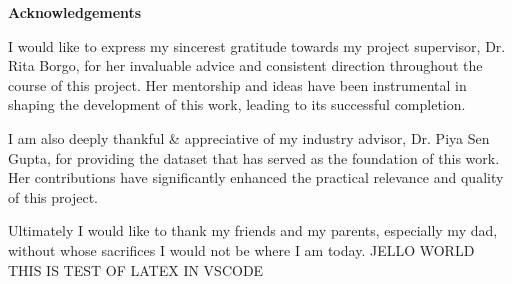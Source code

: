 
\mbox{}\newline\vspace{10mm} \mbox{}\LARGE
%
{\bf Acknowledgements} \normalsize \vspace{5mm}

\par I would like to express my sincerest gratitude towards my project supervisor, Dr. Rita Borgo, for her invaluable advice and consistent 
direction throughout the course of this project. Her mentorship and ideas have been instrumental in shaping the development of this work, 
leading to its successful completion.

\par I am also deeply thankful \& appreciative of my industry advisor, Dr. Piya Sen Gupta, for providing the dataset that has served as the 
foundation of this work. Her contributions have significantly enhanced the practical relevance and quality of this project.

\par Ultimately I would like to thank my friends and my parents, especially my dad, without whose sacrifices I would not be where I am today.
JELLO WORLD THIS IS TEST OF LATEX IN VSCODE
